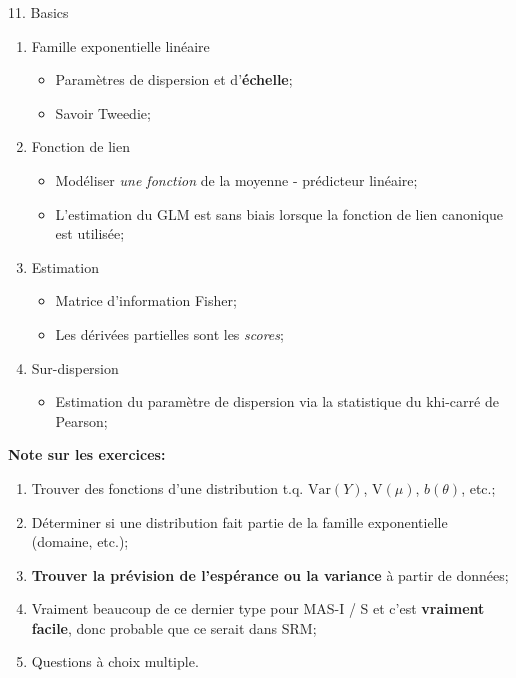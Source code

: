 \documentclass[12pt, titlepage, french]{report}
\begin{document}
\begin{CHPT_SUMM}{11. Basics}
\begin{enumerate}
	\item	Famille exponentielle linéaire
	\begin{itemize}
		\item	Paramètres de dispersion et d'\textbf{échelle};
		\item	Savoir Tweedie;
	\end{itemize}
	\item	Fonction de lien
	\begin{itemize}
		\item	Modéliser \textit{une fonction} de la moyenne - prédicteur linéaire;
		\item	L'estimation du GLM est sans biais lorsque la fonction de lien canonique est utilisée;
	\end{itemize}
	\item	Estimation
	\begin{itemize}
		\item	Matrice d'information Fisher;
		\item	Les dérivées partielles sont les \textit{scores};
	\end{itemize}
	\item	Sur-dispersion
	\begin{itemize}
		\item	Estimation du paramètre de dispersion via la statistique du khi-carré de Pearson;
	\end{itemize}
\end{enumerate}
\textbf{Note sur les exercices:} 
\begin{enumerate}
	\item	Trouver des fonctions d'une distribution t.q. $\text{Var}(Y)$, $\text{V}(\mu)$, $b(\theta)$, etc.;
	\item	Déterminer si une distribution fait partie de la famille exponentielle (domaine, etc.);
	\item	\textbf{Trouver la prévision de l'espérance ou la variance} à partir de données;
	\item[]	Vraiment beaucoup de ce dernier type pour MAS-I / S et c'est \textbf{vraiment facile}, donc probable que ce serait dans SRM;
	\item	Questions à choix multiple.
\end{enumerate}
\end{CHPT_SUMM}
\end{document}
